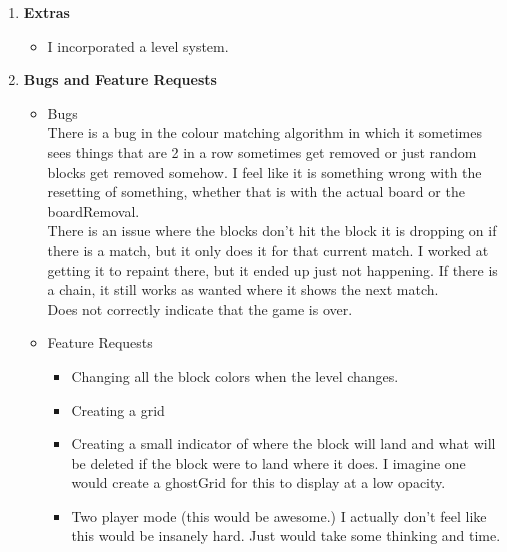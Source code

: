 \documentclass{article}
\begin{document}
\begin{enumerate}[leftmargin=1in]
\begin{itemize}
	\end{itemize}

\item\textbf{Extras}
	\begin{itemize}
		\item I incorporated a level system.
	\end{itemize}

\item\textbf{Bugs and Feature Requests}
	\begin{itemize}
		\item Bugs\\
		There is a bug in the colour matching algorithm in which it sometimes sees things that are 2 in a row sometimes get removed or just random blocks get removed somehow. I feel like it is something wrong with the resetting of something, whether that is with the actual board or the boardRemoval. \\
		There is an issue where the blocks don't hit the block it is dropping on if there is a match, but it only does it for that current match. I worked at getting it to repaint there, but it ended up just not happening. If there is a chain, it still works as wanted where it shows the next match.\\
		Does not correctly indicate that the game is over.
		
		\item Feature Requests
			\begin{itemize}
				\item Changing all the block colors when the level changes.
				\item Creating a grid
				\item Creating a small indicator of where the block will land and what will be deleted if the block were to land where it does. I imagine one would create a ghostGrid for this to display at a low opacity.
				\item Two player mode (this would be awesome.) I actually don't feel like this would be insanely hard. Just would take some thinking and time.
			\end{itemize}
		
	\end{itemize}

\end{enumerate}
\end{document}
